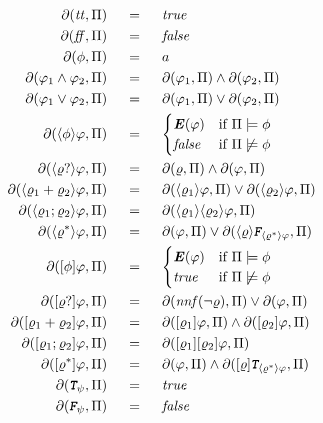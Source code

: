 \begin{align}
\begin{aligned}
\Dfun{\ttrue} 			\ind &= \ind \true\\
\Dfun{\ffalse} 			\ind &= \ind \false\\
\Dfun{\PropFormula}   	\ind &= \ind a\\
\Dfun{\varphi_1 \AND \varphi_2} 			\ind &= \ind   \Dfun{\varphi_1} \AND \Dfun{\varphi_2}\\
\Dfun{\varphi_1 \OR  \varphi_2} 			\ind &= \ind   \Dfun{\varphi_1} \OR \Dfun{\varphi_2}\\
\Dfun{\DIAM{\PropFormula}\varphi}             \ind &= \ind 
	\begin{cases}
		\textbf{\textit{E}}(\varphi) 	& \text{if}\ \PropInt \models \PropFormula\\
		\false     						& \text{if}\ \PropInt \not\models \PropFormula\\
	\end{cases}\\
\Dfun{\DIAM{\regexp?}\varphi}             			\ind &= \ind \Dfun{\regexp} \AND \Dfun{\varphi}\\
\Dfun{\DIAM{\regexp_1 + \regexp_2}\varphi}             \ind &= \ind \Dfun{\DIAM{\regexp_1}\varphi} \OR \Dfun{\DIAM{\regexp_2}\varphi}\\
\Dfun{\DIAM{\regexp_1 ; \regexp_2}\varphi}             \ind &= \ind \Dfun{\DIAM{\regexp_1}\DIAM{\regexp_2}\varphi}\\
\Dfun{\DIAM{\regexp^*}\varphi}             			\ind &= \ind \Dfun{\varphi} \OR \Dfun{\DIAM{\regexp}\FalseDelta{\DIAM{\regexp^*}\varphi}}\\
\Dfun{\BOX{\PropFormula}\varphi}             \ind &= \ind 
	\begin{cases}
		\textbf{\textit{E}}(\varphi) 	& \text{if}\ \PropInt \models \PropFormula\\
		\true     						& \text{if}\ \PropInt \not\models \PropFormula\\
	\end{cases}\\
\Dfun{\BOX{\regexp?}\varphi}             			\ind &= \ind \Dfun{\nnf(\NOT \regexp)} \OR \Dfun{\varphi}\\
\Dfun{\BOX{\regexp_1 + \regexp_2}\varphi}             \ind &= \ind \Dfun{\BOX{\regexp_1}\varphi} \AND \Dfun{\BOX{\regexp_2}\varphi}\\
\Dfun{\BOX{\regexp_1 ; \regexp_2}\varphi}             \ind &= \ind \Dfun{\BOX{\regexp_1}\BOX{\regexp_2}\varphi}\\
\Dfun{\BOX{\regexp^*}\varphi}             			\ind &= \ind \Dfun{\varphi} \AND \Dfun{\BOX{\regexp}\TrueDelta{\DIAM{\regexp^*}\varphi}}\\
\Dfun{\TrueDelta{\psi}} 			\ind &= \ind \true\\
\Dfun{\FalseDelta{\psi}} 			\ind &= \ind \false\\
\end{aligned}					
\end{align}
